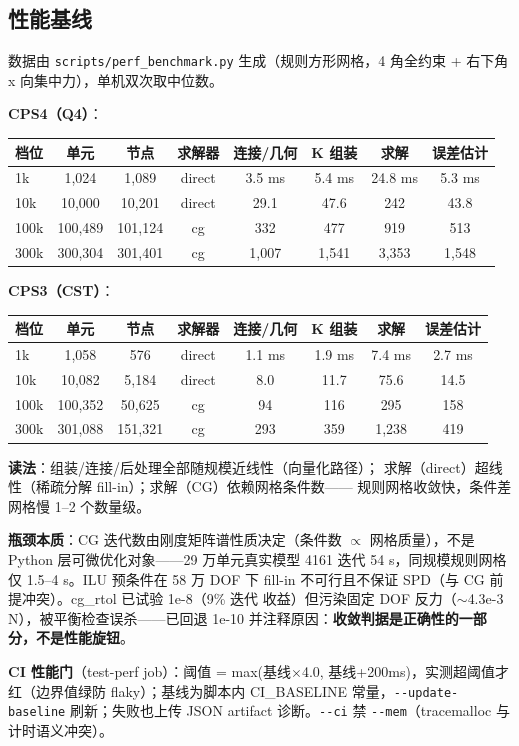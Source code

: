 \documentclass[12pt,a4paper]{ctexart}
\newcommand{\fem}{\Verb}
\begin{document}
\subsection{性能基线}

数据由 \fem|scripts/perf_benchmark.py| 生成（规则方形网格，4 角全约束
+ 右下角 x 向集中力），单机双次取中位数。

\textbf{CPS4（Q4）}：

\begin{longtable}{lccccccc}
\toprule
档位 & 单元 & 节点 & 求解器 & 连接/几何 & K 组装 & 求解 & 误差估计 \\
\midrule
1k & 1,024 & 1,089 & direct & 3.5 ms & 5.4 ms & 24.8 ms & 5.3 ms \\
10k & 10,000 & 10,201 & direct & 29.1 & 47.6 & 242 & 43.8 \\
100k & 100,489 & 101,124 & cg & 332 & 477 & 919 & 513 \\
300k & 300,304 & 301,401 & cg & 1,007 & 1,541 & 3,353 & 1,548 \\
\bottomrule
\end{longtable}

\textbf{CPS3（CST）}：

\begin{longtable}{lccccccc}
\toprule
档位 & 单元 & 节点 & 求解器 & 连接/几何 & K 组装 & 求解 & 误差估计 \\
\midrule
1k & 1,058 & 576 & direct & 1.1 ms & 1.9 ms & 7.4 ms & 2.7 ms \\
10k & 10,082 & 5,184 & direct & 8.0 & 11.7 & 75.6 & 14.5 \\
100k & 100,352 & 50,625 & cg & 94 & 116 & 295 & 158 \\
300k & 301,088 & 151,321 & cg & 293 & 359 & 1,238 & 419 \\
\bottomrule
\end{longtable}

\textbf{读法}：组装/连接/后处理全部随规模近线性（向量化路径）；
求解（direct）超线性（稀疏分解 fill-in）；求解（CG）依赖网格条件数——
规则网格收敛快，条件差网格慢 1--2 个数量级。

\textbf{瓶颈本质}：CG 迭代数由刚度矩阵谱性质决定（条件数 $\propto$
网格质量），不是 Python 层可微优化对象——29 万单元真实模型 4161 迭代
54 s，同规模规则网格仅 1.5--4 s。ILU 预条件在 58 万 DOF 下 fill-in
不可行且不保证 SPD（与 CG 前提冲突）。cg\_rtol 已试验 1e-8（9\% 迭代
收益）但污染固定 DOF 反力（$\sim$4.3e-3 N），被平衡检查误杀——已回退
1e-10 并注释原因：\textbf{收敛判据是正确性的一部分，不是性能旋钮}。

\textbf{CI 性能门}（test-perf job）：阈值 = max(基线$\times$4.0,
基线+200ms)，实测超阈值才红（边界值绿防 flaky）；基线为脚本内
CI\_BASELINE 常量，\fem|--update-baseline| 刷新；失败也上传 JSON
artifact 诊断。\fem|--ci| 禁 \fem|--mem|（tracemalloc 与计时语义冲突）。
\end{document}
